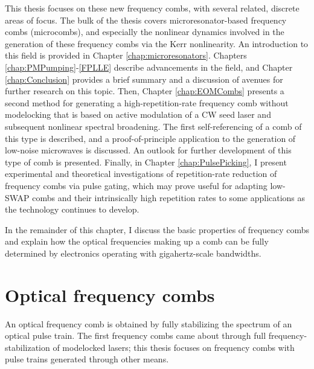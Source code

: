 


This thesis focuses on these new frequency combs, with several related, discrete areas of focus. The bulk of the thesis covers microresonator-based frequency combs (microcombs), and especially the nonlinear dynamics involved in the generation of these frequency combs via the Kerr nonlinearity. An introduction to this field is provided in Chapter \ref{chap:microresonators}. Chapters \ref{chap:PMPumping}-\ref{FPLLE} describe advancements in the field, and Chapter \ref{chap:Conclusion} provides a brief summary and a discussion of avenues for further research on this topic. Then, Chapter \ref{chap:EOMCombs} presents a second method for generating a high-repetition-rate frequency comb without modelocking that is based on active modulation of a CW seed laser and subsequent nonlinear spectral broadening. The first self-referencing of a comb of this type is described, and a proof-of-principle application to the generation of low-noise microwaves is discussed. An outlook for further development of this type of comb is presented. Finally, in Chapter \ref{chap:PulsePicking}, I present experimental and theoretical investigations of repetition-rate reduction of frequency combs via pulse gating, which may prove useful for adapting low-SWAP combs and their intrinsically high repetition rates to some applications as the technology continues to develop. 

In the remainder of this chapter, I discuss the basic properties of frequency combs and explain how the optical frequencies making up a comb can be fully determined by electronics operating with gigahertz-scale bandwidths.

\section{Optical frequency combs}

An optical frequency comb is obtained by fully stabilizing the spectrum of an optical pulse train. The first frequency combs came about through full frequency-stabilization of modelocked lasers; this thesis focuses on frequency combs with pulse trains generated through other means.

